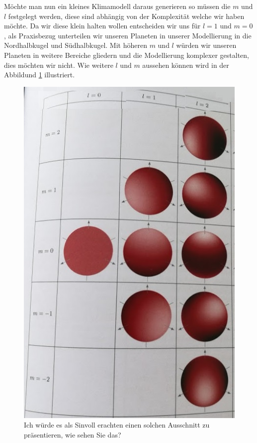 \begin{refsection}
Möchte man nun ein kleines Klimamodell daraus generieren so müssen die  $m$ und $l$ festgelegt werden, diese sind abhängig von der Komplexität welche wir haben möchte. Da wir diese klein halten wollen entscheiden wir uns für $l=1$ und $m=0$, als Praxisbezug unterteilen wir unseren Planeten in unserer Modellierung in die Nordhalbkugel und Südhalbkugel. Mit höheren $m$ und $l$ würden wir unseren Planeten in weitere Bereiche gliedern und die Modellierung komplexer gestalten, dies möchten wir nicht. Wie weitere $l$ und $m$ aussehen können wird in der Abbildund  \ref{klima:spektral:tabea} illustriert.
\begin{figure}
\centering
\includegraphics[width=0.7\hsize]{klima/tabeaLM.jpg}
\caption{Ich würde es als Sinvoll erachten einen solchen Ausschnitt zu präsentieren, wie sehen Sie das? \cite{skript:tabea}
\label{klima:spektral:tabea}}
\end{figure}


\end{refsection}
